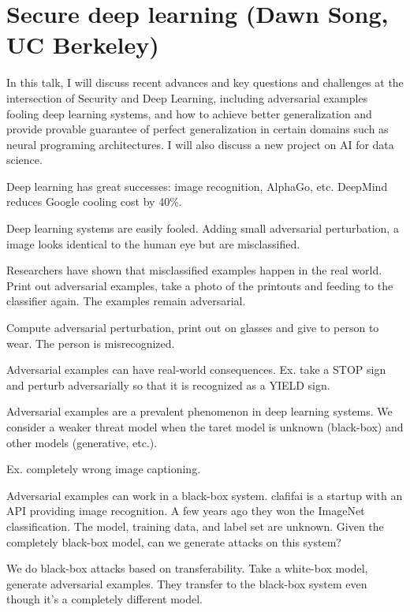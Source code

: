\section{Secure deep learning (Dawn Song, UC Berkeley)}

In this talk, I will discuss recent advances and key questions and challenges at the intersection of Security and Deep Learning, including adversarial examples fooling deep learning systems, and how to achieve better generalization and provide provable guarantee of perfect generalization in certain domains such as neural programing architectures. I will also discuss a new project on AI for data science.

Deep learning has great successes: image recognition, AlphaGo, etc. DeepMind reduces Google cooling cost by 40\%.

Deep learning systems are easily fooled. Adding small adversarial perturbation, a image looks identical to the human eye but are misclassified.

Researchers have shown that misclassified examples happen in the real world. Print out adversarial examples, take a photo of the printouts and feeding to the classifier again. The examples remain adversarial.

Compute adversarial perturbation, print out on glasses and  give to person to wear. The person is misrecognized.


Adversarial examples can have real-world consequences. Ex. take a STOP sign and perturb adversarially so that it is recognized as a YIELD sign.

Adversarial examples are a prevalent phenomenon in deep learning systems. We consider a weaker threat model when the taret model is unknown (black-box) and other models (generative, etc.).

Ex. completely wrong image captioning.

Adversarial examples can work in a black-box system. clafifai is a startup with an API providing image recognition. A few years ago they won the ImageNet classification. The model, training data, and label set are unknown. 
Given the completely black-box model, can we generate attacks on this system?

We do black-box attacks based on transferability. Take a white-box model, generate adversarial examples. They transfer to the black-box system even though it's a completely different model.


